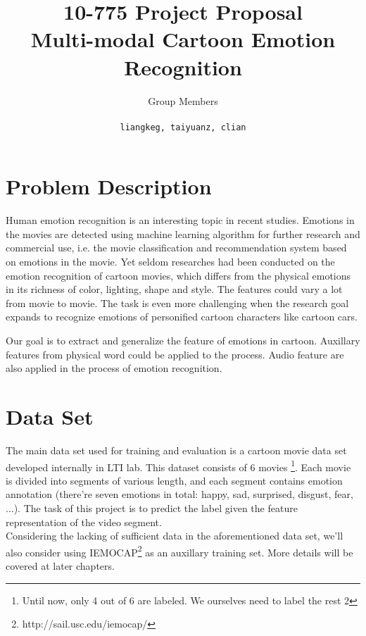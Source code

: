 \documentclass[a4page]{article}
\author{Group Members \\ \text{Liangke Gui, Taiyuan Zhang, Chengliang Lian} \\ \texttt{liangkeg, taiyuanz, clian}
}
\title{10-775 Project Proposal \\ Multi-modal Cartoon Emotion Recognition}
\date{}
\begin{document}
\maketitle


\section{Problem Description}
Human emotion recognition is an interesting topic in recent studies. Emotions in the movies are detected using machine learning algorithm for further research and commercial use, i.e. the movie classification and recommendation system based on emotions in the movie. Yet seldom researches had been conducted on the emotion recognition of cartoon movies, which differs from the physical emotions in its richness of color, lighting, shape and style. The features could vary a lot from movie to movie. The task is even more challenging when the research goal expands to recognize emotions of personified cartoon characters like cartoon cars.

Our goal is to extract and generalize the feature of emotions in cartoon. Auxillary features from physical word could be applied to the process. Audio feature are also applied in the process of emotion recognition.



\section{Data Set}
The main data set used for training and evaluation is a cartoon movie data set developed internally in LTI lab. This dataset consists of 6 movies \footnote{Until now, only 4 out of 6 are labeled. We ourselves need to label the rest 2}. Each movie is divided into segments of various length, and each segment contains emotion annotation (there're seven emotions in total: happy, sad, surprised, disgust, fear, ...). The task of this project is to predict the label given the feature representation of the video segment. \\

Considering the lacking of sufficient data in the aforementioned data set, we'll also consider using IEMOCAP\footnote{http://sail.usc.edu/iemocap/} as an auxillary training set. More details will be covered at later chapters.
\end{document}
